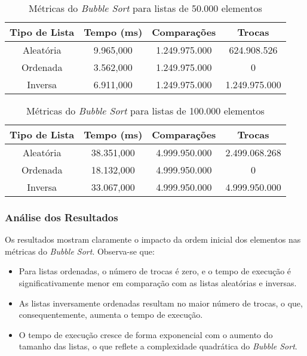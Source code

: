\documentclass[a4paper,12pt]{article}
\begin{document}
\begin{table}[H]
\centering
\caption{Métricas do \textit{Bubble Sort} para listas de 50.000 elementos}
\begin{tabular}{|c|c|c|c|}
\hline
\textbf{Tipo de Lista} & \textbf{Tempo (ms)} & \textbf{Comparações} & \textbf{Trocas} \\ \hline
Aleatória              & 9.965,000           & 1.249.975.000        & 624.908.526     \\ \hline
Ordenada               & 3.562,000           & 1.249.975.000        & 0               \\ \hline
Inversa                & 6.911,000           & 1.249.975.000        & 1.249.975.000   \\ \hline
\end{tabular}
\end{table}

\begin{table}[H]
\centering
\caption{Métricas do \textit{Bubble Sort} para listas de 100.000 elementos}
\begin{tabular}{|c|c|c|c|}
\hline
\textbf{Tipo de Lista} & \textbf{Tempo (ms)} & \textbf{Comparações} & \textbf{Trocas} \\ \hline
Aleatória              & 38.351,000          & 4.999.950.000        & 2.499.068.268   \\ \hline
Ordenada               & 18.132,000          & 4.999.950.000        & 0               \\ \hline
Inversa                & 33.067,000          & 4.999.950.000        & 4.999.950.000   \\ \hline
\end{tabular}
\end{table}

\subsubsection{Análise dos Resultados}

Os resultados mostram claramente o impacto da ordem inicial dos elementos nas métricas do \textit{Bubble Sort}. Observa-se que:

\begin{itemize}
    \item Para listas ordenadas, o número de trocas é zero, e o tempo de execução é significativamente menor em comparação com as listas aleatórias e inversas.
    \item As listas inversamente ordenadas resultam no maior número de trocas, o que, consequentemente, aumenta o tempo de execução.
    \item O tempo de execução cresce de forma exponencial com o aumento do tamanho das listas, o que reflete a complexidade quadrática do \textit{Bubble Sort}.
\end{itemize}
\end{document}
